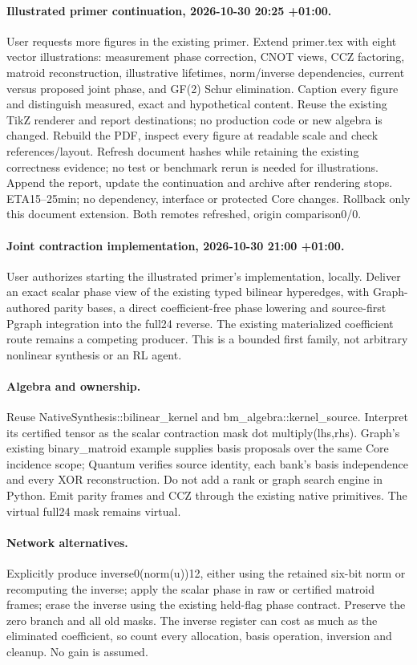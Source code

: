 \documentclass{article}
\begin{document}
\paragraph{Illustrated primer continuation, 2026-10-30 20:25 +01:00.}
User requests more figures in the existing primer. Extend primer.tex with eight
vector illustrations: measurement phase correction, CNOT views, CCZ factoring,
matroid reconstruction, illustrative lifetimes, norm/inverse dependencies,
current versus proposed joint phase, and GF(2) Schur elimination. Caption every
figure and distinguish measured, exact and hypothetical content. Reuse the
existing TikZ renderer and report destinations; no production code or new
algebra is changed. Rebuild the PDF, inspect every figure at readable scale and
check references/layout. Refresh document hashes while retaining the existing
correctness evidence; no test or benchmark rerun is needed for illustrations.
Append the report, update the continuation and archive after rendering stops.
ETA15--25min; no dependency, interface or protected Core changes. Rollback only
this document extension. Both remotes refreshed, origin comparison0/0.
\paragraph{Joint contraction implementation, 2026-10-30 21:00 +01:00.}
User authorizes starting the illustrated primer's implementation, locally.
Deliver an exact scalar phase view of the existing typed bilinear hyperedges,
with Graph-authored parity bases, a direct coefficient-free phase lowering and
source-first Pgraph integration into the full24 reverse. The existing materialized
coefficient route remains a competing producer. This is a bounded first family,
not arbitrary nonlinear synthesis or an RL agent.
\paragraph{Algebra and ownership.} Reuse NativeSynthesis::bilinear\_kernel and
bm\_algebra::kernel\_source. Interpret its certified tensor as the scalar
contraction mask dot multiply(lhs,rhs). Graph's existing binary\_matroid example
supplies basis proposals over the same Core incidence scope; Quantum verifies
source identity, each bank's basis independence and every XOR reconstruction.
Do not add a rank or graph search engine in Python. Emit parity frames and CCZ
through the existing native primitives. The virtual full24 mask remains virtual.
\paragraph{Network alternatives.} Explicitly produce inverse0(norm(u))12,
either using the retained six-bit norm or recomputing the inverse; apply the
scalar phase in raw or certified matroid frames; erase the inverse using the
existing held-flag phase contract. Preserve the zero branch and all old masks.
The inverse register can cost as much as the eliminated coefficient, so count
every allocation, basis operation, inversion and cleanup. No gain is assumed.
\end{document}
